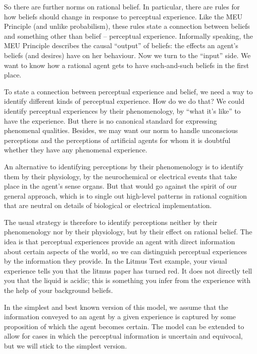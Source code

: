 So there are further norms on rational belief. In particular, there
are rules for how beliefs should change in response to perceptual
experience. Like the MEU Principle (and unlike probabilism), these
rules state a connection between beliefs and something other than
belief -- perceptual experience. Informally speaking, the MEU Principle
describes the causal ``output'' of beliefs: the effects an agent's
beliefs (and desires) have on her behaviour. Now we turn to the
``input'' side. We want to know how a rational agent gets to have
such-and-such beliefs in the first place.

To state a connection between perceptual experience and belief, we
need a way to identify different kinds of perceptual experience. How
do we do that? We could identify perceptual experiences by their
phenomenology, by ``what it's like'' to have the experience. But there
is no canonical standard for expressing phenomenal qualities. Besides,
we may want our norm to handle unconscious perceptions and the
perceptions of artificial agents for whom it is doubtful whether they
have any phenomenal experience.

An alternative to identifying perceptions by their phenomenology is to
identify them by their physiology, by the neurochemical or electrical
events that take place in the agent's sense organs. But that would go
against the spirit of our general approach, which is to single out
high-level patterns in rational cognition that are neutral on
details of biological or electrical implementation.

The usual strategy is therefore to identify perceptions neither by
their phenomenology nor by their physiology, but by their effect on
rational belief. The idea is that perceptual experiences provide an
agent with direct information about certain aspects of the world, so
we can distinguish perceptual experiences by the information they
provide. In the Litmus Test example, your visual experience tells you
that the litmus paper has turned red. It does not directly tell you
that the liquid is acidic; this is something you infer from the
experience with the help of your background beliefs.

In the simplest and best known version of this model, we assume that
the information conveyed to an agent by a given experience is captured
by some proposition of which the agent becomes certain. The model can
be extended to allow for cases in which the perceptual information is
uncertain and equivocal, but we will stick to the simplest version.



